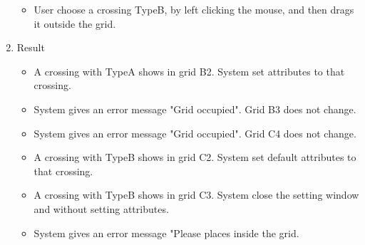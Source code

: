\begin{enumerate}
\begin{itemize}
		\item User choose a crossing TypeB, by left clicking the mouse, and then drags it outside the grid.
	\end{itemize}
	\item Result
	\begin{itemize}
		\item A crossing with TypeA shows in grid B2. System set attributes to that crossing.
		\item System gives an  error message "Grid occupied". Grid B3 does not change.
		\item System gives an  error message "Grid occupied". Grid C4 does not change.
		\item A crossing with TypeB shows in grid C2. System set default attributes to that crossing.
		\item A crossing with TypeB shows in grid C3. System close the setting window and without setting attributes.
		\item System gives an error message "Please places inside the grid.
	\end{itemize}
\end{enumerate}

\newpage

